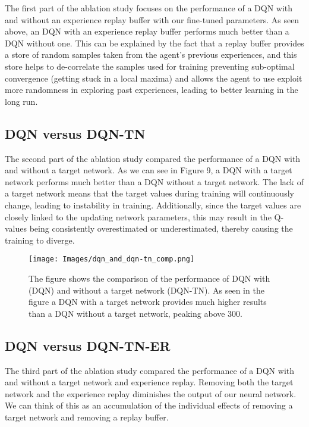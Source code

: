 \documentclass{article}
\begin{document}
 The first part of the ablation study focuses on the performance of a DQN with and without an experience replay buffer with our fine-tuned parameters. As seen above, an DQN with an experience replay buffer performs much better than a DQN without one. This can be explained by the fact that a replay buffer provides a store of random samples taken from the agent's previous experiences, and this store helps to de-correlate the samples used for training preventing sub-optimal convergence (getting stuck in a local maxima) and allows the agent to use exploit more randomness in exploring past experiences, leading to better learning in the long run.  




\subsection{DQN versus DQN-TN}

The second part of the ablation study compared the performance of a DQN with and without a target network. As we can see in Figure 9, a DQN with a target network performs much better than a DQN without a target network. The lack of a target network means that the target values during training will continuously change, leading to instability in training. Additionally, since the target values are closely linked to the updating network parameters, this may result in the Q-values being consistently overestimated or underestimated, thereby causing the training to diverge.


\begin{figure}[h!]
\centering
\texttt{[image: Images/dqn\_and\_dqn-tn\_comp.png]}
\caption{\label{fig:Comparison of DQN with and without TN}The figure shows the comparison of the performance of DQN with (DQN) and without a target network (DQN-TN). As seen in the figure a DQN with a target network provides much higher results than a DQN without a target network, peaking above 300.  }
\end{figure}



\subsection{DQN versus DQN-TN-ER}
The third part of the ablation study compared the performance of a DQN with and without a target network and experience replay. Removing both the target network and the experience replay diminishes the output of our neural network. We can think of this as an accumulation of the individual effects of removing a target network and removing a replay buffer. 
\end{document}
